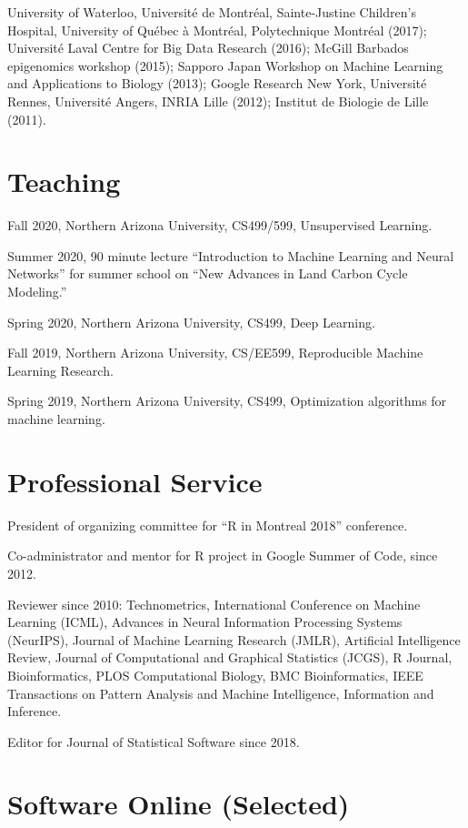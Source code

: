 \documentclass[margin,line]{res}
\begin{document}
\begin{resume}
University of Waterloo, Université de Montréal, Sainte-Justine
Children's Hospital, University of Québec à Montréal, Polytechnique
Montréal (2017); Universit\'e Laval Centre for Big Data Research
(2016); McGill Barbados epigenomics workshop (2015); Sapporo Japan
Workshop on Machine Learning and Applications to Biology (2013);
Google Research New York, Universit\'e Rennes,
Universit\'e Angers, INRIA Lille  (2012); Institut de Biologie
de Lille (2011).

\section{\sc Teaching}

Fall 2020, Northern Arizona University, CS499/599, Unsupervised
Learning.

Summer 2020, 90 minute lecture ``Introduction to Machine Learning and
Neural Networks'' for summer school on ``New Advances in Land Carbon
Cycle Modeling.''

Spring 2020, Northern Arizona University, CS499, Deep Learning.

Fall 2019, Northern Arizona University, CS/EE599, Reproducible Machine
Learning Research.

Spring 2019, Northern Arizona University, CS499, Optimization
algorithms for machine learning.

\section{\sc Professional Service}

President of organizing committee for ``R in Montreal 2018'' conference.

Co-administrator and mentor for R project in Google Summer of Code,
since 2012.

Reviewer since 2010: Technometrics, International Conference on
Machine Learning (ICML), Advances in Neural Information Processing
Systems (NeurIPS), Journal of Machine Learning Research (JMLR),
Artificial Intelligence Review, Journal of Computational and Graphical
Statistics (JCGS), R Journal, Bioinformatics, PLOS Computational
Biology, BMC Bioinformatics, IEEE Transactions on Pattern Analysis and
Machine Intelligence, Information and Inference.

Editor for Journal of Statistical Software since 2018.

\section{\sc Software Online (Selected)} 


\end{resume}
\end{document}
